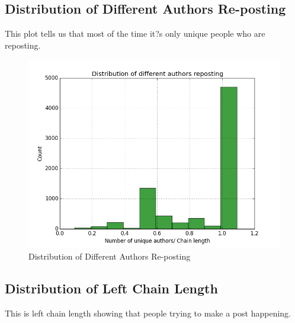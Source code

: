 \documentclass{article} %
\begin{document}
\subsection{Distribution of Different Authors Re-posting}

This plot tells us that most of the time it?s only unique people who are reposting. 

\begin{figure}[h]
\begin{center}
\includegraphics[width=5in]{unique_authors.png}
\caption{Distribution of Different Authors Re-posting}
\end{center}
\end{figure}

\subsection{Distribution of Left Chain Length}

This is left chain length showing that people trying to make a post happening. 
\end{document}
